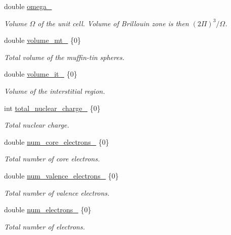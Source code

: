 \begin{DoxyCompactItemize}
double \hyperlink{classsirius_1_1_unit__cell_ac587c752016025de36db5ac4312112b4}{omega\+\_\+}
\begin{DoxyCompactList}\small\item\em Volume $ \Omega $ of the unit cell. Volume of Brillouin zone is then $ (2\Pi)^3 / \Omega $. \end{DoxyCompactList}\item 
double \hyperlink{classsirius_1_1_unit__cell_abc60aef6ddce77ee141f793d241a7954}{volume\+\_\+mt\+\_\+} \{0\}
\begin{DoxyCompactList}\small\item\em Total volume of the muffin-\/tin spheres. \end{DoxyCompactList}\item 
double \hyperlink{classsirius_1_1_unit__cell_ad9356b5d033e2cf0d02cc31d78db3561}{volume\+\_\+it\+\_\+} \{0\}
\begin{DoxyCompactList}\small\item\em Volume of the interstitial region. \end{DoxyCompactList}\item 
int \hyperlink{classsirius_1_1_unit__cell_a72e8437b162d6e934e2e7763d9f76e11}{total\+\_\+nuclear\+\_\+charge\+\_\+} \{0\}
\begin{DoxyCompactList}\small\item\em Total nuclear charge. \end{DoxyCompactList}\item 
double \hyperlink{classsirius_1_1_unit__cell_ac618473d45a36ccca6be2b6bfd27a5de}{num\+\_\+core\+\_\+electrons\+\_\+} \{0\}
\begin{DoxyCompactList}\small\item\em Total number of core electrons. \end{DoxyCompactList}\item 
double \hyperlink{classsirius_1_1_unit__cell_abd38f81cdedf2bad43dd2746bb866e0e}{num\+\_\+valence\+\_\+electrons\+\_\+} \{0\}
\begin{DoxyCompactList}\small\item\em Total number of valence electrons. \end{DoxyCompactList}\item 
double \hyperlink{classsirius_1_1_unit__cell_acf4750818ca4a8f1bae847a34879d16e}{num\+\_\+electrons\+\_\+} \{0\}
\begin{DoxyCompactList}\small\item\em Total number of electrons. \end{DoxyCompactList}\item 

\end{DoxyCompactItemize}
